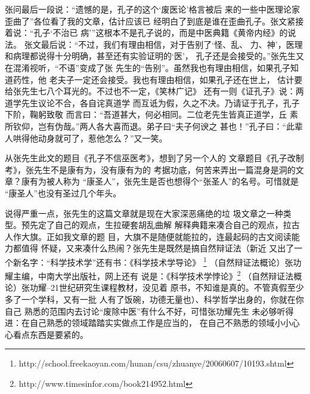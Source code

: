 张问最后一段说：“遗憾的是，孔子的这个‘废医论’格言被后
来的一些中医理论家歪曲了”各位看了我的文章，估计应该已
经明白了到底是谁在歪曲孔子。张文紧接着说：“孔子‘不治已
病’”这根本不是孔子说的，而是中医典籍《黄帝内经》的说法。
张文最后说：“不过，我们有理由相信，对于告别了‘怪、乱、
力、神’，医理和病理都说得十分明确，甚至还有实验证明的‘医’，
孔子还是会接受的。”张先生又在混淆视听，“不语”变成了张
先生的“告别”。虽然我也有理由相信，如果孔子知道药性，他
老夫子一定还会接受。我也有理由相信，如果孔子还在世上，
估计要给张先生七八个耳光的。不过也不一定，《笑林广记》
还有一则《证孔子》说：两道学先生议论不合，各自诧真道学
而互诋为假，久之不决。乃请证于孔子，孔子下阶，鞠躬致敬
而言曰：“吾道甚大，何必相同。二位老先生皆真正道学，丘
素所钦仰，岂有伪哉。”两人各大喜而退。弟子曰“夫子何谀之
甚也！”孔子曰：“此辈人哄得他动身就可了，惹他怎么？”又一笑。

从张先生此文的题目《孔子不信巫医考》，想到了另一个人的
文章题目《孔子改制考》，张先生不是康有为，没有康有为的
考据功底，何苦来弄出一篇混身是洞的文章？康有为被人称为
“康圣人”，张先生是否也想得个“张圣人”的名号。可惜就是
“康圣人”也没有圣过几个年头。

说得严重一点，张先生的这篇文章就是现在大家深恶痛绝的垃
圾文章之一种类型。预先定了自己的观点，生拉硬套胡乱曲解
解释典籍来凑合自己的观点，拉古人作大旗。正如我文章的题
目，大旗不是随便就能拉的，连最起码的古文阅读能力都值得
怀疑，又来凑什么热闹？张先生是既然是搞自然辩证法（新近
又出了一个新名字：“科学技术学”还有书：《科学技术学导论》
\footnote{http://school.freekaoyan.com/hunan/csu/zhuanye/20060607/10193.shtml}
（自然辩证法概论）张功耀主编，中南大学出版社，网上还有
说是：《科学技术学悖论》\footnote{http://www.timesinfor.com/book214952.html}
（自然辩证法概论）张功耀--21世纪研究生课程教材，没见着
原书，不知谁是真的。不管真假至少多了一个学科，又有一批
人有了饭碗，功德无量也）、科学哲学出身的，你就在你自己
熟悉的范围内去讨论“废除中医”有什么不好，可惜张功耀先生
未必够听得进：在自己熟悉的领域踏踏实实做点工作是应当的，
在自己不熟悉的领域小小心心看点东西是要紧的。
